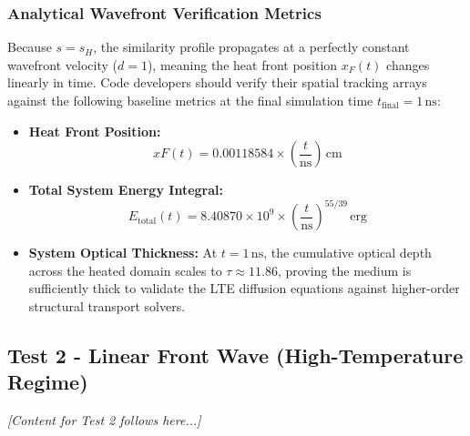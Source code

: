 \documentclass[11pt]{article}
\begin{document}
\subsubsection{Analytical Wavefront Verification Metrics}
Because $s = s_H$, the similarity profile propagates at a perfectly constant wavefront velocity ($d = 1$), meaning the heat front position $x_F(t)$ changes linearly in time. Code developers should verify their spatial tracking arrays against the following baseline metrics at the final simulation time $t_{\text{final}} = 1\,\text{ns}$:
\begin{itemize}
    \item \textbf{Heat Front Position:} 
    \begin{equation}
        xF(t) = 0.00118584 \times \left(\frac{t}{\text{ns}}\right) \,\text{cm}
    \end{equation}
    \item \textbf{Total System Energy Integral:} 
    \begin{equation}
        E_{\text{total}}(t) = 8.40870 \times 10^9 \times \left(\frac{t}{\text{ns}}\right)^{55/39} \,\text{erg}
    \end{equation}
    \item \textbf{System Optical Thickness:} At $t = 1\,\text{ns}$, the cumulative optical depth across the heated domain scales to $\tau \approx 11.86$, proving the medium is sufficiently thick to validate the LTE diffusion equations against higher-order structural transport solvers.
\end{itemize}

\subsection{Test 2 - Linear Front Wave (High-Temperature Regime)}
\textit{[Content for Test 2 follows here...]}
\end{document}
